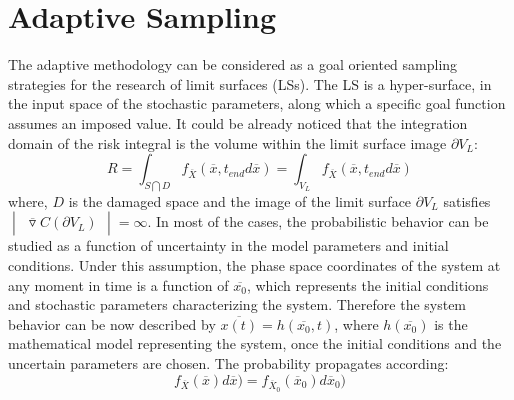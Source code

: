 \documentclass{anstrans}
\begin{document}
\section{Adaptive Sampling}
The  adaptive methodology can be considered as a goal oriented sampling strategies for the research of limit surfaces (LSs). The LS is a hyper-surface, in the input space of the stochastic parameters, along which a specific goal function assumes an imposed value. 
It could be already noticed that the integration domain of the risk integral is the volume within the limit surface image $\partial V_{L}$:
\begin{equation} 
R=\int_{S\bigcap D} f _{\overline{X}}(\overline{x},t_{end}d\overline{x}) =\int_{V_{L}}    f _{\overline{X}}(\overline{x},t_{end}d\overline{x})    
\end{equation}
where, $D$ is the damaged space and the image of the limit surface $\partial V_{L}$ satisfies $\begin{vmatrix} \overline{\triangledown} C\left ( \partial V_{L} \right ) \end{vmatrix} = \infty $.
In most of the cases\cite{MathFrameworkMC2013}, the probabilistic behavior can be studied as a function of uncertainty in the model parameters and initial conditions.
Under this assumption, the phase space coordinates of the system at any moment in time is a function of $\overline{x_{0}}$, which represents the initial conditions and stochastic parameters characterizing the system. Therefore the system behavior can be now described by $\overline{x(t)}=h(\overline{x_{0}},t)$, where $h(\overline{x_{0}})$ is the mathematical model representing the system, once the initial conditions and the uncertain parameters are chosen. The probability propagates according:
\begin{equation} 
f _{\overline{X}}(\overline{x})d\overline{x}) = f _{\overline{X}_{0}}(\overline{x}_{0})d\overline{x}_{0})
\end{equation}
\end{document}

